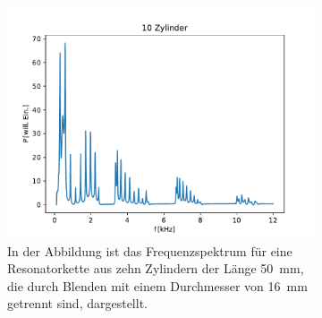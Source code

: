 \begin{figure}[ht]
                \centering
                \begin{subfigure}[b]{0.45\textwidth}
                    \centering
                    \includegraphics[scale=0.45]{./pictures/1dim_10_Zylinder_16mm.pdf}
                    \caption{In der Abbildung ist das Frequenzspektrum für eine Resonatorkette aus zehn Zylindern der Länge \SI{50}{\milli\metre}, die durch Blenden mit einem Durchmesser von \SI{16}{\milli\metre} getrennt sind, dargestellt.}
                    \label{fig:1dim_10_Zylinder_16mm}
                \end{subfigure}
                \caption{}
                \label{fig:jucktnicht}
            \end{figure}
            \FloatBarrier


